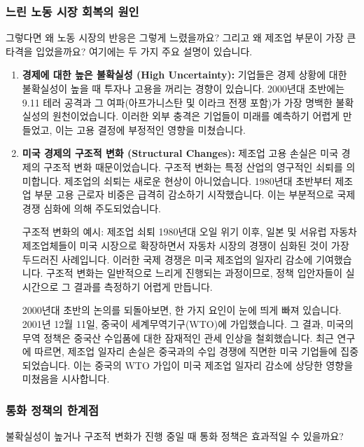 \documentclass[11pt,a4paper]{article}
\begin{document}
\subsubsection{느린 노동 시장 회복의 원인}
그렇다면 왜 노동 시장의 반응은 그렇게 느렸을까요? 그리고 왜 제조업 부문이 가장 큰 타격을 입었을까요? 여기에는 두 가지 주요 설명이 있습니다.

\begin{enumerate}
    \item \textbf{경제에 대한 높은 불확실성 (High Uncertainty):}
    기업들은 경제 상황에 대한 불확실성이 높을 때 투자나 고용을 꺼리는 경향이 있습니다. 2000년대 초반에는 9.11 테러 공격과 그 여파(아프가니스탄 및 이라크 전쟁 포함)가 가장 명백한 불확실성의 원천이었습니다. 이러한 외부 충격은 기업들이 미래를 예측하기 어렵게 만들었고, 이는 고용 결정에 부정적인 영향을 미쳤습니다.

    \item \textbf{미국 경제의 구조적 변화 (Structural Changes):}
    제조업 고용 손실은 미국 경제의 구조적 변화 때문이었습니다. 구조적 변화는 특정 산업의 영구적인 쇠퇴를 의미합니다. 제조업의 쇠퇴는 새로운 현상이 아니었습니다. 1980년대 초반부터 제조업 부문 고용 근로자 비중은 급격히 감소하기 시작했습니다. 이는 부분적으로 국제 경쟁 심화에 의해 주도되었습니다.

    \begin{examplebox}{구조적 변화의 예시: 제조업 쇠퇴}
    1980년대 오일 위기 이후, 일본 및 서유럽 자동차 제조업체들이 미국 시장으로 확장하면서 자동차 시장의 경쟁이 심화된 것이 가장 두드러진 사례입니다. 이러한 국제 경쟁은 미국 제조업의 일자리 감소에 기여했습니다. 구조적 변화는 일반적으로 느리게 진행되는 과정이므로, 정책 입안자들이 실시간으로 그 결과를 측정하기 어렵게 만듭니다.

    2000년대 초반의 논의를 되돌아보면, 한 가지 요인이 눈에 띄게 빠져 있습니다. 2001년 12월 11일, 중국이 세계무역기구(WTO)에 가입했습니다. 그 결과, 미국의 무역 정책은 중국산 수입품에 대한 잠재적인 관세 인상을 철회했습니다. 최근 연구에 따르면, 제조업 일자리 손실은 중국과의 수입 경쟁에 직면한 미국 기업들에 집중되었습니다. 이는 중국의 WTO 가입이 미국 제조업 일자리 감소에 상당한 영향을 미쳤음을 시사합니다.
    \end{examplebox}
\end{enumerate}

\subsubsection{통화 정책의 한계점}
불확실성이 높거나 구조적 변화가 진행 중일 때 통화 정책은 효과적일 수 있을까요?
\end{document}
